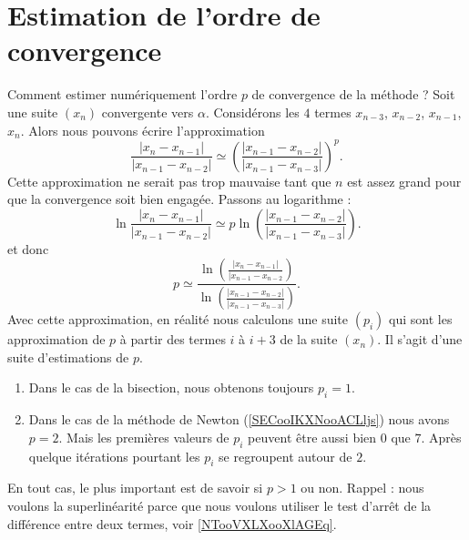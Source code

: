 
\section{Estimation de l'ordre de convergence}

Comment estimer numériquement l'ordre \( p\) de convergence de la méthode ? Soit une suite \( (x_n)\) convergente vers \( \alpha\). Considérons les \( 4\) termes \( x_{n-3}\), \( x_{n-2}\), \( x_{n-1}\), \( x_n\). Alors nous pouvons écrire l'approximation
\begin{equation}
    \frac{ | x_n -x_{n-1}| }{ | x_{n-1}-x_{n-2} | }\simeq \left( \frac{ | x_{n-1}-x_{n-2} | }{ | x_{n-1}-x_{n-3} | } \right)^p.
\end{equation}
Cette approximation ne serait pas trop mauvaise tant que \( n\) est assez grand pour que la convergence soit bien engagée. Passons au logarithme :
\begin{equation}
    \ln \frac{ | x_n -x_{n-1}| }{ | x_{n-1}-x_{n-2} | }\simeq p\ln \left( \frac{ | x_{n-1}-x_{n-2} | }{ | x_{n-1}-x_{n-3} | } \right).
\end{equation}
et donc
\begin{equation}
    p\simeq \frac{ \ln\left( \frac{ | x_n -x_{n-1}| }{ | x_{n-1}-x_{n-2} } \right) }{ \ln \left(\frac{ | x_{n-1}-x_{n-2} | }{ | x_{n-1}-x_{n-3} | } \right)}.
\end{equation}
Avec cette approximation, en réalité nous calculons une suite \( (p_i)\) qui sont les approximation de \( p\) à partir des termes \( i\) à \(i+3 \) de la suite \( (x_n)\). Il s'agit d'une suite d'estimations de \( p\).

\begin{enumerate}
    \item
Dans le cas de la bisection, nous obtenons toujours \( p_i=1\).
\item
    Dans le cas de la méthode de Newton (\ref{SECooIKXNooACLljs}) nous avons \( p=2\). Mais les premières valeurs de \( p_i\) peuvent être aussi bien \( 0\) que \( 7\). Après quelque itérations pourtant les \( p_i\) se regroupent autour de \( 2\).
\end{enumerate}
En tout cas, le plus important est de savoir si \( p>1\) ou non. Rappel : nous voulons la superlinéarité parce que nous voulons utiliser le test d'arrêt de la différence entre deux termes, voir \ref{NTooVXLXooXlAGEq}. 

